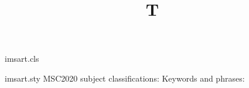 \begin{filecontents*}{imsart.cls}
\RequirePackage{imsart}
\end{filecontents*}
\begin{filecontents*}{imsart.sty}
\def\sep@key@value#1=#2/?/#3{\setpkgattr{#3}{#1}{#2}}
\def\do@option@list#1#2{\@for\curr@option:={#2}\do{\expandafter\sep@key@value\curr@option/?/{#1}\relax}}
\protected\def\setpkgattr#1#2#3{\expandafter\long\expandafter\gdef\csname #1@#2\endcsname{#3}}
\def\ims@href#1#2{#2}
\def\msc@url{https://mathscinet.ams.org/mathscinet/msc/msc2020.html}
\newtoks\keywords@list
\def\addto@keywords@list#1{\keywords@list=\expandafter{\the\keywords@list#1, }}
\newbox\keyword@box
\setpkgattr{keyword}{MSC2020}{\ims@href{\msc@url}{MSC2020 subject classifications}:}
\setpkgattr{keyword}{KWD}{Keywords and phrases:}
\gdef\keyword{\@ifnextchar[{\@keyword}{\@keyword[class=KWD]}}
\gdef\@keyword[#1]{\do@option@list{keyword}{#1}\def\keyword@name{\csname keyword@\keyword@class\endcsname}%
  \let\kwd@sep\relax
  \global\setbox\keyword@box=\vbox\bgroup\ifvoid\keyword@box\else\unvbox\keyword@box\fi
  \noindent{\keyword@name}\space\hskip.1pt}
\def\endkeyword{\unskip.\par\egroup}
\def\keyword@fmt{\ifvoid\keyword@box\else\unvbox\keyword@box\fi}
\def\sep{\unskip\string, }
\DeclareRobustCommand*\kwd{\@ifnextchar[\@kwd{\@kwd[\kwd@sep]}}
\def\@kwd[#1]#2{\unskip#1{#2}\addto@keywords@list{#2}\let\kwd@sep\sep}
\newenvironment{frontmatter}{}{\maketitle}
\def\maketitle{\keyword@fmt}
\end{filecontents*}
\documentclass{imsart}
\renewcommand{\kwd}[1]{\texttt{#1}}

\begin{frontmatter}
\title{T}
\end{frontmatter}
The \kwd{if} statement and the \kwd{while} loop.

